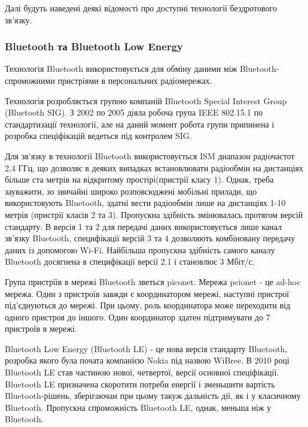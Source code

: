 \documentclass[a4paper,ukrainian,utf8,nocolumnsxix,floatsection]{eskdtext}
\renewcommand\paragraph{\subsubsection}
\begin{document}

Далі будуть наведені деякі відомості про доступні технології бездротового зв’язку.

\paragraph{Bluetooth та Bluetooth Low Energy} %
\label{par:bluetooth_bluetooth_low_energy}

Технологія Bluetooth використовується для обміну даними між Bluetooth-спроможними пристріями в персональних радіомережах. 

Технологія розробляється групою компаній Bluetooth Special Interest Group (Bluetooth SIG). З 2002 по 2005 діяла робоча група IEEE 802.15.1 по стандартизації технології, але на даний момент робота групи припинена і розробка спеціфікацій ведеться під контролем SIG.

Для зв’язку в технології Bluetooth використовується ISM диапазон радіочастот 2,4 ГГц, що дозволяє в деяких випадках встановлювати радіообмін на дистанціях більше ста метрів на відкритому простірі(пристрії класу 1). Однак, треба зауважити, зо звичайні широко розповсюджені мобільні прилади, що використовують Bluetooth, здатні вести радіообмін лише на дистанціях 1-10 метрів (пристрії класів 2 та 3). Пропускна здібність змінювалась протягом версій стандарту. В версія 1 та 2 для передачі даних використовується лише канал зв’язку Bluetooth, специфікації версій 3 та 4 дозволяють комбіновану передачу даних із допомогою Wi-Fi. Найбільша пропускна здібність самого каналу Bluetooth досягнена в специфікації версії 2.1 і становлює 3 Мбіт/с. 

Група пристріїв в мережі Bluetooth зветься piconet. Мережа pcionet - це ad-hoc мережа. Один з пристроїв завжди є координатором мережі, наступні пристрої під’єднуються до мережі. При цьому, роль координатора може переходити від одного пристроя до іншого. Один координатор здатен підтримувати до 7 пристроїв в мережі.

Bluetooth Low Energy (Bluetooth LE) - це нова версія стандарту Bluetooth, розробка якого була почата  компанією Nokia під назвою WiBree. В 2010 році Bluetooth LE став частиною нової, четвертої, версії основної спеціфікації. Bluetooth LE призначена скоротити потреби енергії і зменьшити вартість Bluetooth-рішень, зберігаючаи при цьому такуж дальність дії, як і у класичному Bluetooth. Пропускна спроможність Bluetooth LE, однак, меньша ніж у Bluetooth.
\end{document}

